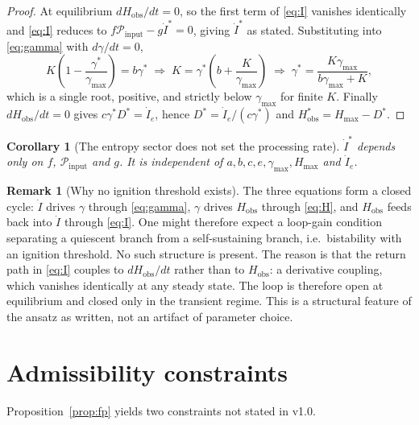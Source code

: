 \documentclass[11pt,a4paper]{article}
\newtheorem{corollary}[proposition]{Corollary}
\theoremstyle{definition}
\newtheorem{remark}[proposition]{Remark}
\begin{document}
\begin{proof}
At equilibrium $dH_{\text{obs}}/dt=0$, so the first term of \eqref{eq:I}
vanishes identically and \eqref{eq:I} reduces to
$f\mathcal{P}_{\text{input}}-g\dot I^{*}=0$, giving $\dot I^{*}$ as stated.
Substituting into \eqref{eq:gamma} with $d\gamma/dt=0$,
\begin{equation}
K\left(1-\frac{\gamma^{*}}{\gamma_{\max}}\right)=b\gamma^{*}
\;\Longrightarrow\;
K=\gamma^{*}\!\left(b+\frac{K}{\gamma_{\max}}\right)
\;\Longrightarrow\;
\gamma^{*}=\frac{K\gamma_{\max}}{b\gamma_{\max}+K},
\end{equation}
which is a single root, positive, and strictly below $\gamma_{\max}$ for
finite $K$. Finally $dH_{\text{obs}}/dt=0$ gives
$c\gamma^{*}D^{*}=\dot I_e$, hence $D^{*}=\dot I_e/(c\gamma^{*})$ and
$H^{*}_{\text{obs}}=H_{\max}-D^{*}$.
\end{proof}

\begin{corollary}[The entropy sector does not set the processing rate]
\label{cor:decouple}
$\dot I^{*}$ depends only on $f$, $\mathcal{P}_{\text{input}}$ and $g$. It is
independent of $a,b,c,e,\gamma_{\max},H_{\max}$ and $\dot I_e$.
\end{corollary}

\begin{remark}[Why no ignition threshold exists]
The three equations form a closed cycle: $\dot I$ drives $\gamma$ through
\eqref{eq:gamma}, $\gamma$ drives $H_{\text{obs}}$ through \eqref{eq:H}, and
$H_{\text{obs}}$ feeds back into $\dot I$ through \eqref{eq:I}. One might
therefore expect a loop-gain condition separating a quiescent branch from a
self-sustaining branch, i.e.\ bistability with an ignition threshold. No such
structure is present. The reason is that the return path in \eqref{eq:I}
couples to $dH_{\text{obs}}/dt$ rather than to $H_{\text{obs}}$: a derivative
coupling, which vanishes identically at any steady state. The loop is
therefore open at equilibrium and closed only in the transient regime. This is
a structural feature of the ansatz as written, not an artifact of parameter
choice.
\end{remark}

\section{Admissibility constraints}

Proposition~\ref{prop:fp} yields two constraints not stated in v1.0.
\end{document}
